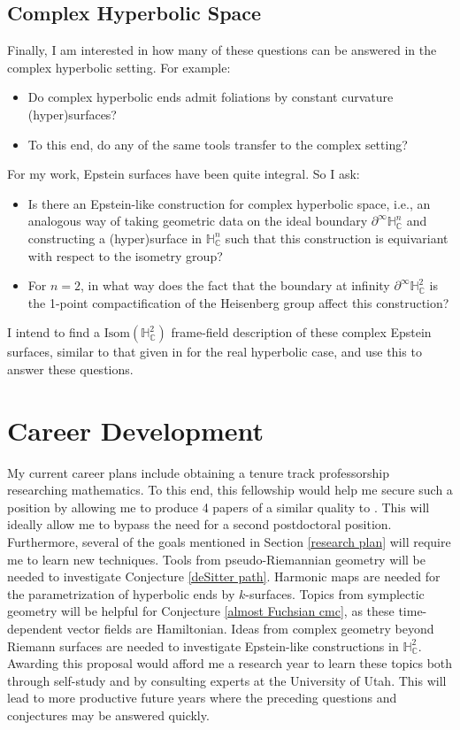 \documentclass[11pt]{amsart}
\newcommand{\C}{\mathbb{C}}
\renewcommand{\H}{\mathbb{H}}
\begin{document}
\subsection{Complex Hyperbolic Space}
Finally, I am interested in how many of these questions can be answered in the complex hyperbolic setting. For example:
\begin{itemize}
\item Do complex hyperbolic ends admit foliations by constant curvature (hyper)surfaces?
\item To this end, do any of the same tools transfer to the complex setting? 
\end{itemize}
For my work, Epstein surfaces have been quite integral. So I ask:
\begin{itemize}
\item Is there an Epstein-like construction for complex hyperbolic space, i.e., an analogous way of taking geometric data on the ideal boundary $\partial^\infty \H_{\C}^n$ and constructing a (hyper)surface in $\H_{\C}^n$ such that this construction is equivariant with respect to the isometry group? 
\item For $n=2$, in what way does the fact that the boundary at infinity $\partial^\infty \H_{\C}^2$ is the 1-point compactification of the Heisenberg group affect this construction?
\end{itemize}
I intend to find a $\mathrm{Isom}(\H_{\C}^2)$ frame-field description of these complex Epstein surfaces, similar to that given in \cite{dumas2017} for the real hyperbolic case, and use this to answer these questions.





\section{Career Development}
My current career plans include obtaining a tenure track professorship researching mathematics. To this end, this fellowship would help me secure such a position by allowing me to produce 4 papers of a similar quality to \cite{quinn2019}. This will ideally allow me to bypass the need for a second postdoctoral position. Furthermore, several of the goals mentioned in Section \ref{research plan} will require me to learn new techniques. Tools from pseudo-Riemannian geometry will be needed to investigate Conjecture \ref{deSitter path}. Harmonic maps are needed for the parametrization of hyperbolic ends by $k$-surfaces. Topics from symplectic geometry will be helpful for Conjecture \ref{almost Fuchsian cmc}, as these time-dependent vector fields are Hamiltonian. Ideas from complex geometry beyond Riemann surfaces are needed to investigate Epstein-like constructions in $\H_{\C}^2$. Awarding this proposal would afford me a research year to learn these topics both through self-study and by consulting experts at the University of Utah. This will lead to more productive future years where the preceding questions and conjectures may be answered quickly. 
\end{document}
